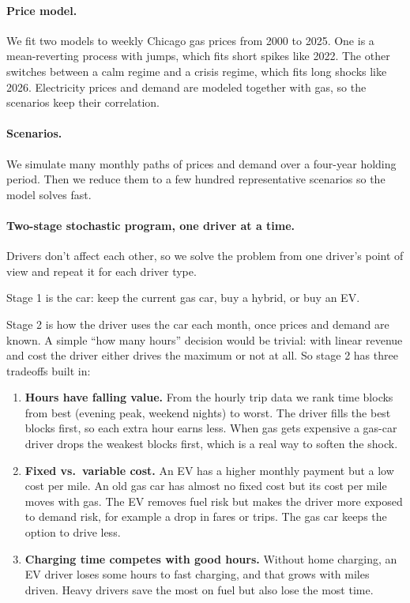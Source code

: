 \documentclass[11pt]{article}
\begin{document}
\paragraph{Price model.} We fit two models to weekly Chicago gas prices from 2000 to 2025. One is a mean-reverting process with jumps, which fits short spikes like 2022. The other switches between a calm regime and a crisis regime, which fits long shocks like 2026. Electricity prices and demand are modeled together with gas, so the scenarios keep their correlation.

\paragraph{Scenarios.} We simulate many monthly paths of prices and demand over a four-year holding period. Then we reduce them to a few hundred representative scenarios so the model solves fast.

\paragraph{Two-stage stochastic program, one driver at a time.} Drivers don't affect each other, so we solve the problem from one driver's point of view and repeat it for each driver type.

Stage 1 is the car: keep the current gas car, buy a hybrid, or buy an EV.

Stage 2 is how the driver uses the car each month, once prices and demand are known. A simple ``how many hours'' decision would be trivial: with linear revenue and cost the driver either drives the maximum or not at all. So stage 2 has three tradeoffs built in:
\begin{enumerate}
  \item \textbf{Hours have falling value.} From the hourly trip data we rank time blocks from best (evening peak, weekend nights) to worst. The driver fills the best blocks first, so each extra hour earns less. When gas gets expensive a gas-car driver drops the weakest blocks first, which is a real way to soften the shock.
  \item \textbf{Fixed vs.\ variable cost.} An EV has a higher monthly payment but a low cost per mile. An old gas car has almost no fixed cost but its cost per mile moves with gas. The EV removes fuel risk but makes the driver more exposed to demand risk, for example a drop in fares or trips. The gas car keeps the option to drive less.
  \item \textbf{Charging time competes with good hours.} Without home charging, an EV driver loses some hours to fast charging, and that grows with miles driven. Heavy drivers save the most on fuel but also lose the most time.
\end{enumerate}
\end{document}
